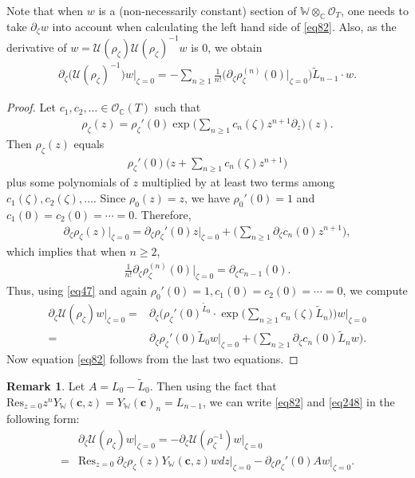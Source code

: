 \documentclass[12pt,a4paper,notitlepage]{report}
\theoremstyle{definition}
\newtheorem{rem}[df]{Remark}
\theoremstyle{plain}
\newcommand{\mc}{\mathcal}
\newcommand{\wtd}{\widetilde}
\newcommand{\Res}{\mathrm{Res}}
\newcommand{\scr}{\mathscr}
\newcommand{\Wbb}{\mathbb W}
\newcommand{\Cbb}{\mathbb C}
\newcommand{\cbf}{\mathbf c}
\numberwithin{equation}{section}
\begin{document}
Note that when $w$ is a (non-necessarily constant) section of $\Wbb\otimes_\Cbb\scr O_T$, one needs to take $\partial_\zeta w$ into account when calculating the left hand side of \eqref{eq82}. Also, as the derivative of $w=\mc U(\rho_\zeta)\mc U(\rho_\zeta)^{-1}w$ is $0$, we obtain
\begin{align}
\partial_\zeta\big(\mc U(\rho_\zeta)^{-1}\big)w\Big|_{\zeta=0}=-\sum_{n\geq 1}\frac 1{n!}\Big(\partial_\zeta\rho_\zeta^{(n)}(0)\Big|_{\zeta=0}\Big)\wtd L_{n-1}\cdot w.\label{eq248}
\end{align}


\begin{proof}
Let $c_1,c_2,\dots\in\scr O_{\Cbb}(T)$ such that 
\begin{gather*}
\rho_\zeta(z)=\rho_\zeta'(0)\exp\Big(\sum_{n\geq 1}c_n(\zeta)z^{n+1}\partial_z\Big)(z).
\end{gather*}
Then $\rho_\zeta(z)$ equals
\begin{align*}
\rho_\zeta'(0)\Big(z+\sum_{n\geq 1}c_n(\zeta)z^{n+1}\Big)
\end{align*}
plus some polynomials of $z$ multiplied by at least two terms among $c_1(\zeta),c_2(\zeta),\dots$. Since $\rho_0(z)=z$, we have $\rho_0'(0)=1$ and $c_1(0)=c_2(0)=\cdots=0$. Therefore,
\begin{align*}
\partial_\zeta\rho_\zeta(z)\Big|_{\zeta=0}=\partial_\zeta\rho_\zeta'(0)z\Big|_{\zeta=0}+\Big(\sum_{n\geq 1}\partial_\zeta c_n(0)z^{n+1}\Big),
\end{align*}
which implies that when $n\geq 2$,
\begin{align*}
\frac 1{n!}\partial_\zeta\rho_\zeta^{(n)}(0)\Big|_{\zeta=0}=\partial_\zeta c_{n-1}(0).
\end{align*}
Thus, using \eqref{eq47} and again $\rho_0'(0)=1,c_1(0)=c_2(0)=\cdots=0$, we compute
\begin{align*}
\partial_\zeta\mc U(\rho_\zeta)w\Big|_{\zeta=0}=&\partial_\zeta\Big(\rho_\zeta'(0)^{\wtd L_0}\cdot \exp\Big(\sum_{n\geq1}c_n(\zeta) \wtd L_n\Big)\Big)w\Big|_{\zeta=0}\\
=&\partial_\zeta\rho_\zeta'(0)\wtd L_0w\Big|_{\zeta=0}+\Big(\sum_{n\geq 1}\partial_\zeta c_n(0)\wtd L_nw\Big).
\end{align*}
Now equation \eqref{eq82} follows from the last two equations.
\end{proof}

\begin{rem}\label{lb140}
Let $A=L_0-\wtd L_0$. Then using the fact that $\Res_{z=0}z^n Y_\Wbb(\cbf,z)=Y_\Wbb(\cbf)_n=L_{n-1}$, we can write \eqref{eq82} and \eqref{eq248} in the following form:
\begin{align}
&\partial_\zeta\mc U(\rho_\zeta)w\big|_{\zeta=0}=-\partial_\zeta\mc U(\rho_\zeta^{-1})w\big|_{\zeta=0}\nonumber\\
=&\Res_{z=0}~\partial_\zeta\rho_\zeta(z) Y_\Wbb(\cbf,z) w dz\big|_{\zeta=0}-\partial_\zeta\rho_\zeta'(0)Aw\big|_{\zeta=0}.
\end{align}
\end{rem}
\end{document}

